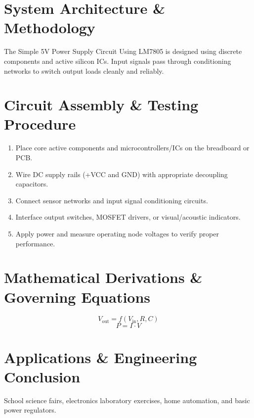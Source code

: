 \documentclass[11pt,a4paper]{article}
\begin{document}
\section{System Architecture \& Methodology}
The Simple 5V Power Supply Circuit Using LM7805 is designed using discrete components and active silicon ICs. Input signals pass through conditioning networks to switch output loads cleanly and reliably.

\section{Circuit Assembly \& Testing Procedure}
\begin{enumerate}
    \item Place core active components and microcontrollers/ICs on the breadboard or PCB.
    \item Wire DC supply rails (+VCC and GND) with appropriate decoupling capacitors.
    \item Connect sensor networks and input signal conditioning circuits.
    \item Interface output switches, MOSFET drivers, or visual/acoustic indicators.
    \item Apply power and measure operating node voltages to verify proper performance.
\end{enumerate}

\section{Mathematical Derivations \& Governing Equations}
\begin{equation}
V_{\text{out}} = f(V_{\text{in}}, R, C)
\end{equation}
\begin{equation}
P = I \cdot V
\end{equation}

\section{Applications \& Engineering Conclusion}
School science fairs, electronics laboratory exercises, home automation, and basic power regulators.
\end{document}

